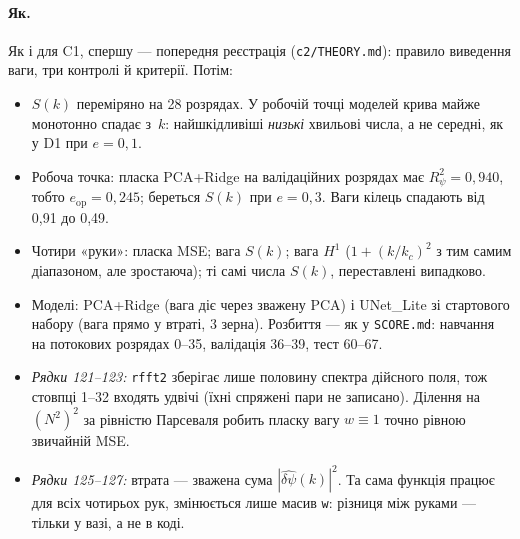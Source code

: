 \paragraph{Як.} Як і для C1, спершу --- попередня реєстрація (\texttt{c2/THEORY.md}): правило
виведення ваги, три контролі й критерії. Потім:
\begin{itemize}
\item $S(k)$ переміряно на 28 розрядах. У робочій точці моделей крива майже монотонно спадає
  з~$k$: найшкідливіші \emph{низькі} хвильові числа, а не середні, як у D1 при $e=0{,}1$.
\item Робоча точка: пласка PCA+Ridge на валідаційних розрядах має $R^2_\psi=0{,}940$, тобто
  $e_{\mathrm{op}}=0{,}245$; береться $S(k)$ при $e=0{,}3$. Ваги кілець спадають від 0,91 до 0,49.
\item Чотири «руки»: пласка MSE; вага $S(k)$; вага $H^1$ ($1+(k/k_c)^2$ з тим самим діапазоном,
  але зростаюча); ті самі числа $S(k)$, переставлені випадково.
\item Моделі: PCA+Ridge (вага діє через зважену PCA) і UNet\_Lite зі стартового набору (вага
  прямо у втраті, 3 зерна). Розбиття --- як у \texttt{SCORE.md}: навчання на потокових розрядах
  0--35, валідація 36--39, тест 60--67.
\end{itemize}


\begin{itemize}
\item \emph{Рядки 121--123:} \texttt{rfft2} зберігає лише половину спектра дійсного поля, тож
  стовпці 1--32 входять удвічі (їхні спряжені пари не записано). Ділення на $(N^2)^2$ за
  рівністю Парсеваля робить пласку вагу $w\equiv1$ точно рівною звичайній MSE.
\item \emph{Рядки 125--127:} втрата --- зважена сума $|\widehat{\delta\psi}(k)|^2$. Та сама
  функція працює для всіх чотирьох рук, змінюється лише масив \texttt{w}: різниця між руками
  --- тільки у вазі, а не в коді.
\end{itemize}

